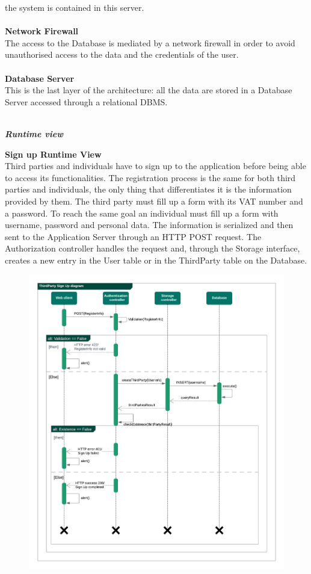 \begin{legal}
the system is contained in this server.\\\\
		\textbf{Network Firewall}\\
The access to the Database is mediated by a network firewall in order to
avoid unauthorised access to the data and the credentials of the user.\\\\
		\textbf{Database Server}\\
This is the last layer of the architecture: all the data are stored in a Database Server accessed through a relational DBMS. \\\\
		\item \textit{\textbf{Runtime view}}\\
			\begin{legal}
				\item \textbf{Sign up Runtime View}\\
Third parties and individuals have to sign up to the application before being able to access its functionalities.
The registration process is the same for both third parties and individuals, the only thing that differentiates it  is the information provided by them.
The third party must fill up a form with its VAT number and a password. To reach the same goal an individual must fill up a form with username, password and personal data.
The information is serialized and then sent to the Application Server through an HTTP POST request.
The Authorization controller handles the request and, through the Storage interface, creates a new
entry in the User table or in the ThirdParty table on the Database. \\
				\begin{figure}[H]
				\includegraphics[width=\linewidth]{images/seq_diagrams/thirdPartySignUpSeq.png}\\

\end{figure}
\end{legal}
\end{legal}
